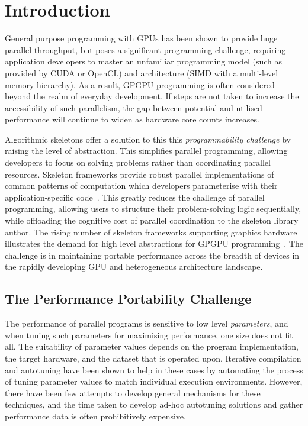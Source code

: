 \documentclass[nonatbib,preprint,9pt]{sigplanconf}
\begin{document}
\section{Introduction}\label{sec:introduction}

General purpose programming with GPUs has been shown to provide huge
parallel throughput, but poses a significant programming challenge,
requiring application developers to master an unfamiliar programming
model (such as provided by CUDA or OpenCL) and architecture (SIMD with
a multi-level memory hierarchy). As a result, GPGPU programming is
often considered beyond the realm of everyday development. If steps
are not taken to increase the accessibility of such parallelism, the
gap between potential and utilised performance will continue to widen
as hardware core counts increases.

Algorithmic skeletons offer a solution to this this
\emph{programmability challenge} by raising the level of
abstraction. This simplifies parallel programming, allowing developers
to focus on solving problems rather than coordinating parallel
resources. Skeleton frameworks provide robust parallel implementations
of common patterns of computation which developers parameterise with
their application-specific code~\cite{Gonzalez2010}. This greatly
reduces the challenge of parallel programming, allowing users to
structure their problem-solving logic sequentially, while offloading
the cognitive cost of parallel coordination to the skeleton library
author. The rising number of skeleton frameworks supporting graphics
hardware illustrates the demand for high level abstractions for GPGPU
programming~\cite{Enmyren2010,Marques2013}. The challenge is in
maintaining portable performance across the breadth of devices in the
rapidly developing GPU and heterogeneous architecture landscape.


\subsection{The Performance Portability Challenge}

The performance of parallel programs is sensitive to low level
\emph{parameters}, and when tuning such parameters for maximising
performance, one size does not fit all. The suitability of parameter
values depends on the program implementation, the target hardware, and
the dataset that is operated upon. %
Iterative compilation and autotuning have been shown to help in these
cases by automating the process of tuning parameter values to match
individual execution environments. %
However, there have been few attempts to develop general mechanisms
for these techniques, and the time taken to develop ad-hoc autotuning
solutions and gather performance data is often prohibitively
expensive.
\end{document}
